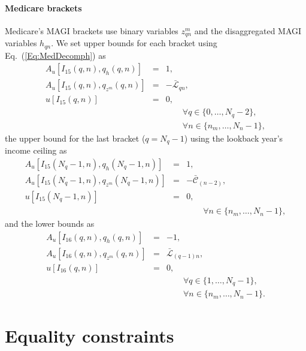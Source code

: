 \documentclass[fleqn,12pt]{report}
\begin{document}
\paragraph*{Medicare brackets}
Medicare's MAGI brackets use binary variables $z^m_{qn}$ and the disaggregated
MAGI variables $h_{qn}$. We set upper bounds for each bracket using Eq.~(\ref{Eq:MedDecomph}) as
\begin{eqnarray}
	A_u[I_{15}(q, n), q_{h}(q, n)] &=& 1, \nonumber \\
	A_u[I_{15}(q, n), q_{z^m}(q, n)] &=& -\bar{\mathcal{L}}_{qn}, \nonumber \\
	u[I_{15}(q, n)] &=& 0, \nonumber \\
	&&\qquad\forall q \in \{0,\ldots, N_q - 2\}, \nonumber\\
	&&\qquad\forall n \in \{n_m,\ldots, N_n - 1\},
\end{eqnarray}
the upper bound for the last bracket ($q = N_q - 1$) using the lookback year's income ceiling as
\begin{eqnarray}
	A_u[I_{15}(N_q - 1, n), q_{h}(N_q - 1, n)] &=& 1, \nonumber \\
	A_u[I_{15}(N_q - 1, n), q_{z^m}(N_q - 1, n)] &=& -\bar{\mathcal{C}}_{(n-2)}, \nonumber \\
	u[I_{15}(N_q - 1, n)] &=& 0, \nonumber \\
	&&\qquad\forall n \in \{n_m,\ldots, N_n - 1\},
\end{eqnarray}
and the lower bounds as
\begin{eqnarray}
	A_u[I_{16}(q, n), q_{h}(q, n)] &=& -1, \nonumber \\
	A_u[I_{16}(q, n), q_{z^m}(q, n)] &=& \bar{\mathcal{L}}_{(q-1)n}, \nonumber \\
	u[I_{16}(q, n)] &=& 0, \nonumber \\
	&&\qquad\forall q \in \{1,\ldots, N_q - 1\}, \nonumber\\
	&&\qquad\forall n \in \{n_m,\ldots, N_n - 1\}.
\end{eqnarray}

\section{Equality constraints}
\end{document}
